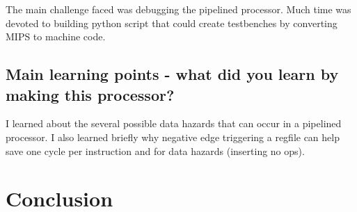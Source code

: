 \documentclass[a4paper,11pt]{article}
\begin{document}
The main challenge faced was debugging the pipelined processor. Much time was devoted to building python script that could create testbenches by converting MIPS to machine code. 


\subsection*{Main learning points - what did you learn by making this processor?}

I learned about the several possible data hazards that can occur in a pipelined processor. I also learned briefly why negative edge triggering a regfile can help save one cycle per instruction and for data hazards (inserting no ops).

\newpage

\section*{Conclusion}
\end{document}
